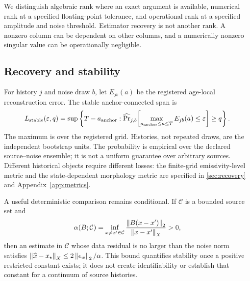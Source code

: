 We distinguish algebraic rank where an exact argument is available, numerical rank at a specified floating-point tolerance, and operational rank at a specified amplitude and noise threshold. Estimator recovery is not another rank. A nonzero column can be dependent on other columns, and a numerically nonzero singular value can be operationally negligible.

\subsection{Recovery and stability}
For history $j$ and noise draw $b$, let $E_{jb}(a)$ be the registered age-local reconstruction error. The stable anchor-connected span is
\begin{equation}
L_{\rm stable}(\varepsilon,q)=
\sup\left\{T-a_{\rm anchor}:
\widehat{\Pr}_{j,b}\!\left[
\max_{a_{\rm anchor}\leq a\leq T} E_{jb}(a)\leq\varepsilon
\right]\geq q\right\}.
\label{eq:stable}
\end{equation}
The maximum is over the registered grid. Histories, not repeated draws, are the independent bootstrap units. The probability is empirical over the declared source--noise ensemble; it is not a uniform guarantee over arbitrary sources. Different historical objects require different losses: the finite-grid emissivity-level metric and the state-dependent morphology metric are specified in \cref{sec:recovery} and Appendix~\ref{app:metrics}.

A useful deterministic comparison remains conditional. If $\mathcal C$ is a bounded source set and
\begin{equation}
\alpha(B;\mathcal C)=
\inf_{x\ne x'\in\mathcal C}\frac{\left\lVert B(x-x')\right\rVert_2}{\left\lVert x-x'\right\rVert_X}>0,
\label{eq:secant}
\end{equation}
then an estimate in $\mathcal C$ whose data residual is no larger than the noise norm satisfies $\left\lVert\widehat x-x_\star\right\rVert_X\leq2\left\lVert\epsilon_w\right\rVert_2/\alpha$. This bound quantifies stability once a positive restricted constant exists; it does not create identifiability or establish that constant for a continuum of source histories.
